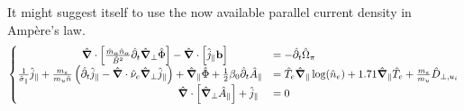 

It might suggest itself to use the now available parallel current density in Ampère's law. 
\begin{equation}
	\label{eq:vorticityEquation_ElectronInertiaElectromagnetism_dedimensionalized_matrix}
	\begin{cases}
		\qquad\qquad\qquad\hat{\grad}\cdot\left[\frac{\hat{m}_\alpha \hat{n}_\alpha}{ \hat{B}^2}\hat{\partial}_t\hat{\grad}_\perp\hat{\Phi}\right] - \hat{\grad}\cdot\left[\hat{j}_\parallel \mathbf{b}\right]
		&= -\hat{\partial}_t \hat{\Omega}_\pi \\
		\frac{1}{\hat{\sigma}_\parallel}\hat{j}_\parallel + \frac{m_e}{m_u\hat{n}} \left(\hat{\partial}_t\hat{j}_\parallel - \hat{\grad}\cdot\hat{\nu}_e\hat{\grad}_\perp\hat{j}_\parallel\right)+ \hat{\grad}_\parallel\hat{\Phi} + \frac{1}{2}\beta_0\hat{\partial}_t\hat{A}_\parallel &= \hat{T}_e\hat{\grad}_\parallel\log(\hat{n}_e) + 1.71\hat{\grad}_\parallel \hat{T}_e + \frac{m_e}{m_u}\hat{D}_{\perp,u_i} \\
		\qquad\qquad\qquad\qquad\qquad\qquad\qquad\quad\hat{\grad}\cdot\left[\hat{\grad}_\perp \hat{A}_\parallel\right] + \hat{j}_\parallel
		&= 0
	\end{cases}
\end{equation}

